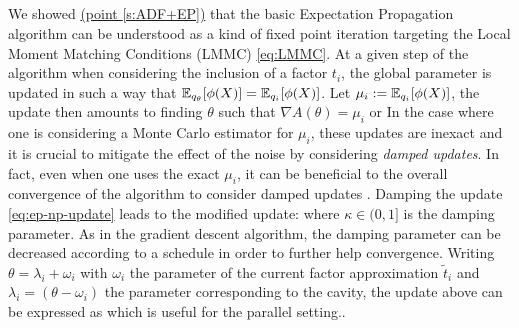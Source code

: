 \subsection{}
We showed \hyperref[s:ADF+EP]{(point \ref*{s:ADF+EP})} that the basic Expectation Propagation algorithm can be understood as a kind of fixed point iteration targeting the Local Moment Matching Conditions (LMMC) \eqref{eq:LMMC}.
At a given step of the algorithm when considering the inclusion of a factor $t_i$, the global parameter is updated in such a way that $\mathbb E_{q_\theta}[\phi(X)]= \mathbb E_{q_i}[\phi(X)]$. Let $\mu_i:=\mathbb E_{q_i}[\phi(X)]$, the update then amounts to finding $\theta$ such that $\nabla A(\theta) = \mu_i$ or
%
%
In the case where one is considering a Monte Carlo estimator for $\mu_i$, these updates are inexact and it is crucial to mitigate the effect of the noise by considering \emph{damped updates}. In fact, even when one uses the exact $\mu_i$, it can be beneficial to the overall convergence of the algorithm to consider damped updates . Damping the update \eqref{eq:ep-np-update} leads to the modified update:
%
%
where $\kappa \in(0,1]$ is the damping parameter. As in the gradient descent algorithm, the damping parameter can be decreased according to a schedule in order to further help convergence.
Writing $\theta=\lambda_i+\omega_i$ with $\omega_i$ the parameter of the current factor approximation $\tilde t_i$ and $\lambda_i=(\theta-\omega_i)$ the parameter corresponding to the cavity, the update above can be expressed as
%
%
which is useful for the parallel setting.. 

\subsection{}

\subsection{}

